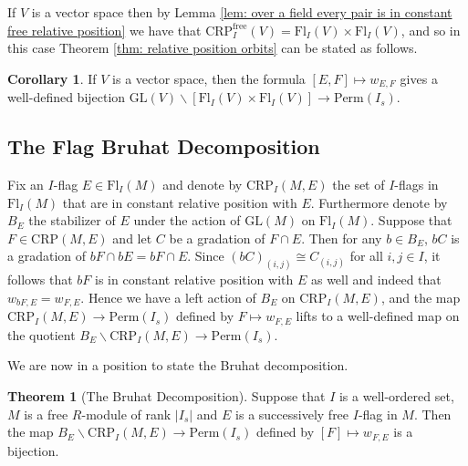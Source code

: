 \documentclass[oneside,11pt]{amsart}
\newcommand{\free}{\ensuremath{\text{free}}}
\newcommand{\CRP}{\ensuremath{\text{CRP}}}
\newcommand{\GL}{\ensuremath{\text{GL}}}
\newcommand{\Fl}{\ensuremath{\text{Fl}}}
\newcommand{\Perm}{\ensuremath{\text{Perm}}}
\theoremstyle{definition}
\newtheorem{proof techniques}{Proof Techniques}
\newtheorem{corollary}{Corollary}
\newtheorem{theorem}{Theorem}
\begin{document}
If $V$ is a vector space then by Lemma \ref{lem: over a field every pair is in constant free relative position} we have that $\CRP^\free_I(V) = \Fl_I(V) \times \Fl_I(V)$, and so in this case Theorem \ref{thm: relative position orbits} can be stated as follows.  

\begin{corollary}
 If $V$ is a vector space, then the formula $[E , F] \mapsto w_{E, F}$ gives a well-defined bijection $\GL(V) \backslash [ \Fl_I(V) \times \Fl_I(V) ] \to \Perm(I_s)$. 
\end{corollary}



\subsection{The Flag Bruhat Decomposition}\label{sub: the flag bruhat decomposition} 


Fix an $I$-flag $E \in \Fl_I(M)$ and denote by $\CRP_I(M , E)$ the set of $I$-flags in $\Fl_I(M)$ that are in constant relative position with $E$. Furthermore denote by $B_E$ the stabilizer of $E$ under the action of $\GL(M)$ on $\Fl_I(M)$. Suppose that $F \in \CRP(M , E)$ and let $C$ be a gradation of $F \cap E$. Then for any $b \in B_E$, $bC$ is a gradation of $bF \cap bE = bF \cap E$. Since $(bC)_{(i , j)} \cong C_{(i, j)}$ for all $i , j \in I$, it follows that $bF$ is in constant relative position with $E$ as well and indeed that $w_{bF, E} = w_{F , E}$. Hence we have a left action of $B_E$ on $\CRP_I(M , E)$, and the map $\CRP_I(M , E) \to \Perm(I_s)$ defined by $F \mapsto w_{F , E}$ lifts to a well-defined map on the quotient $B_E \backslash \CRP_I(M , E) \to \Perm(I_s)$. 

We are now in a position to state the Bruhat decomposition. 

\begin{theorem}[The Bruhat Decomposition]\label{thm: the bruhat decomposition}
Suppose that $I$ is a well-ordered set, $M$ is a free $R$-module of rank $|I_s|$ and $E$ is a successively free $I$-flag in $M$. Then the map $B_E \backslash \CRP_I(M , E) \to \Perm(I_s)$ defined by $[F] \mapsto w_{F , E}$ is a bijection. 
\end{theorem}
\end{document}
